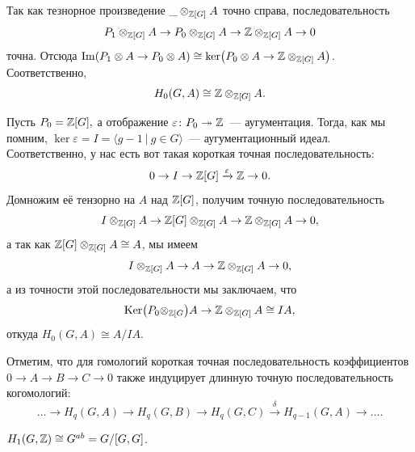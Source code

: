  	\begin{example}
 		Так как тезнорное произведение $\_ \otimes_{\mathbb{Z}[G]} A $ точно справа, последовательность 
 		\[
 			P_1 \otimes_{\mathbb{Z}[G]} A \to P_0 \otimes_{\mathbb{Z}[G]} A \to \mathbb{Z} \otimes_{\mathbb{Z}[G]} A \to 0
 		\]
 		точна. Отсюда $\Im\lr*{P_1 \otimes A \to P_0 \otimes A} \cong \ker\lr*{P_0 \otimes A \to \Z \otimes_{\Z[G]} A }$. Соответственно, 
 		\[
 			H_{0}(G, A) \cong \mathbb{Z} \otimes_{\mathbb{Z}[G]} A.
 		\]

 		Пусть $P_0 = \mathbb{Z}[G], $ а отображение $\varepsilon\colon P_0 \twoheadrightarrow \mathbb{Z}$~--- аугументация. Тогда, как мы помним, $\ker{\varepsilon} = I = \langle g - 1 \ \vert \ g \in G \rangle$~--- аугументационный идеал. Соответственно, у нас есть вот такая короткая точная последовательность: 
 		\[
 			0 \to I \to \mathbb{Z}[G] \xrightarrow{\varepsilon} \mathbb{Z} \to 0.
  		\]
  		Домножим её тензорно на $A$ над $\mathbb{Z}[G]$, получим точную последовательность 
  		\[
  			I \otimes_{\mathbb{Z}[G]} A \to \mathbb{Z}[G] \otimes_{\mathbb{Z}[G]}  A \to \mathbb{Z} \otimes_{\mathbb{Z}[G]} A \to 0,
  		\]
  		а так как $\mathbb{Z}[G] \otimes_{\mathbb{Z}[G]} A \cong A$, мы имеем 
  		\[
  			I \otimes_{\mathbb{Z}[G]} A \to A \to \mathbb{Z} \otimes_{\mathbb{Z}[G]} A \to 0,	
  		\]
  		а из точности этой последовательности мы заключаем, что 
  		\[
			\Ker\lr*{P_0 \otimes_{\Z[G}} A \to \Z \otimes_{\Z[G]} A \cong IA,
  		\]
  		откуда $H_{0}(G, A) \cong A/IA$.
 	\end{example}

 	Отметим, что для гомологий короткая точная последовательность коэффициентов $0 \to A \to B \to C \to 0$ также индуцирует длинную точную последовательность когомологий: 
 	\[
 		\ldots \to  H_{q}(G, A) \to H_{q}(G, B) \to H_{q}(G, C) \xrightarrow{\delta} H_{q - 1}(G, A) \to \ldots.
 	\]

 	\begin{theorem} 
 		$H_{1}(G, \mathbb{Z}) \cong G^{ab} = G/[G, G]$. 
 	\end{theorem}

